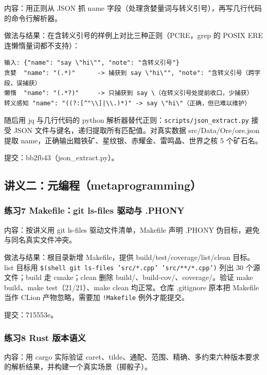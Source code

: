 \documentclass[UTF8]{ctexart}
\begin{document}
内容：用正则从 JSON 抓 name 字段（处理贪婪量词与转义引号），再写几行代码的命令行解析器。

做法与结果：在含转义引号的样例上对比三种正则（PCRE，grep 的 POSIX ERE 连懒惰量词都不支持）：

\begin{lstlisting}
输入: {"name": "say \"hi\"", "note": "含转义引号"}
贪婪  "name": "(.*)"      -> 捕获到 say \"hi\"", "note": "含转义引号（跨字段，误捕获）
懒惰  "name": "(.*?)"     -> 只捕获到 say \（在转义引号处提前收口，少捕获）
转义感知 "name": "((?:[^"\\]|\\.)*)" -> say \"hi\"（正确，但已难以维护）
\end{lstlisting}

随后用 jq 与几行代码的 python 解析器替代正则：\texttt{scripts/json\_extract.py} 接受 JSON 文件与键名，递归提取所有匹配值。对真实数据 src/Data/Ore/ore.json 提取 name，正确输出黯铁矿、星纹银、赤耀金、雷鸣晶、世界之核 5 个矿石名。

提交：bb2fb43（json\_extract.py）。

\subsection{讲义二：元编程（metaprogramming）}

\subsubsection{练习7 Makefile：git ls-files 驱动与 .PHONY}

内容：按讲义用 git ls-files 驱动文件清单，Makefile 声明 .PHONY 伪目标，避免与同名真实文件冲突。

做法与结果：根目录新增 Makefile，提供 build/test/coverage/list/clean 目标。list 目标用 \texttt{\$(shell git ls-files 'src/*.cpp' 'src/**/*.cpp')} 列出 30 个源文件；build 走 cmake；clean 删除 build/、build-cov/、coverage/。验证 make build、make test（21/21）、make clean 均正常。仓库 .gitignore 原本把 Makefile 当作 CLion 产物忽略，需要加 \texttt{!Makefile} 例外才能提交。

提交：715553e。

\subsubsection{练习8 Rust 版本语义}

内容：用 cargo 实际验证 caret、tilde、通配、范围、精确、多约束六种版本要求的解析结果，并构建一个真实场景（掷骰子）。
\end{document}
